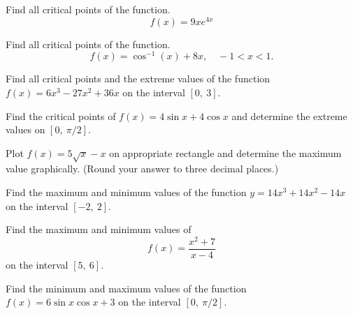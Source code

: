 \documentclass[12pt,addpoints, answers, fleqn]{exam}
\begin{document}
\begin{teacher}
\begin{questions}
Find all critical points of the function.
\[
f\left(x\right) = 9xe^{4x}
\]
\begin{solution}
\end{solution}

\question 	%

Find all critical points of the function.
\[
f\left(x\right) = \cos^{-1}\left(x\right) + 8x ,     \quad - 1 < x < 1.
\]
\begin{solution}
\end{solution}

\question 	%

Find all critical points and the extreme values of the function $f\left(x\right) = 6x^3 - 27x^2 + 36x$ on the interval $\left[0, \ 3\right]$.
 \begin{solution}
\end{solution}
 
\question 	%

Find the critical points of $f\left(x\right) = 4 \sin x + 4 \cos x$ and determine the extreme values on $\left[0, \ \pi/2 \right]$.
 \begin{solution}
\end{solution}
\question 	%

Plot $f\left(x\right) = 5\sqrt{x} - x$  on appropriate rectangle and determine the maximum value graphically. (Round your answer to three decimal places.)
\begin{solution}
\end{solution}
\question 	%

Find the maximum and minimum values of the function $y = 14x^3 + 14x^2 - 14x$ on the interval $\left[-2, \ 2 \right]$.
\begin{solution}
\end{solution}
\question 	%

Find the maximum and minimum values of
\[
f\left(x\right) = \frac{x^2 + 7}{x - 4}
\]
on the interval $\left[ 5, \ 6 \right]$.
\begin{solution}
\end{solution}
\question 	%

Find the minimum and maximum values of the function $f\left(x\right) = 6 \sin x  \cos x + 3$ on the interval $\left[ 0, \ \pi/2 \right]$.

\begin{solution}
\end{solution}
\question 	%


\end{questions}
\end{teacher}
\end{document}
